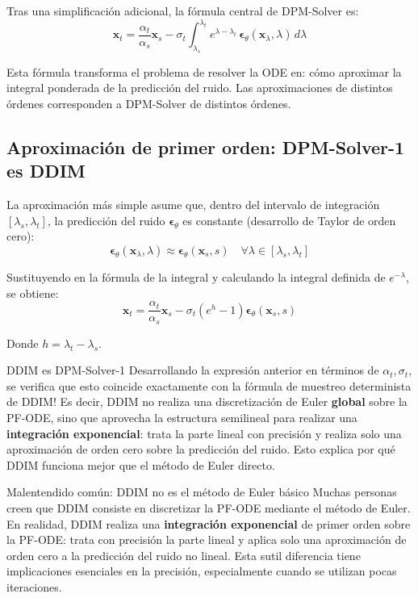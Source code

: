 \documentclass[a4paper]{article}
\begin{document}
Tras una simplificación adicional, la fórmula central de DPM-Solver es:
$$\mathbf{x}_t = \frac{\alpha_t}{\alpha_s} \mathbf{x}_s - \sigma_t \int_{\lambda_s}^{\lambda_t} e^{\lambda - \lambda_t}\, \boldsymbol{\epsilon}_\theta(\mathbf{x}_\lambda, \lambda)\, d\lambda$$

Esta fórmula transforma el problema de resolver la ODE en: cómo aproximar la integral ponderada de la predicción del ruido. Las aproximaciones de distintos órdenes corresponden a DPM-Solver de distintos órdenes.

\subsection{Aproximación de primer orden: DPM-Solver-1 es DDIM}

La aproximación más simple asume que, dentro del intervalo de integración $[\lambda_s, \lambda_t]$, la predicción del ruido $\boldsymbol{\epsilon}_\theta$ es constante (desarrollo de Taylor de orden cero):
$$\boldsymbol{\epsilon}_\theta(\mathbf{x}_\lambda, \lambda) \approx \boldsymbol{\epsilon}_\theta(\mathbf{x}_s, s) \quad \forall \lambda \in [\lambda_s, \lambda_t]$$

Sustituyendo en la fórmula de la integral y calculando la integral definida de $e^{-\lambda}$, se obtiene:
$$\mathbf{x}_t = \frac{\alpha_t}{\alpha_s} \mathbf{x}_s - \sigma_t (e^{h} - 1) \boldsymbol{\epsilon}_\theta(\mathbf{x}_s, s)$$

Donde $h = \lambda_t - \lambda_s$.

\begin{importantbox}{DDIM es DPM-Solver-1}
Desarrollando la expresión anterior en términos de $\alpha_t, \sigma_t$, se verifica que esto coincide exactamente con la fórmula de muestreo determinista de DDIM! Es decir, DDIM no realiza una discretización de Euler \textbf{global} sobre la PF-ODE, sino que aprovecha la estructura semilineal para realizar una \textbf{integración exponencial}: trata la parte lineal con precisión y realiza solo una aproximación de orden cero sobre la predicción del ruido. Esto explica por qué DDIM funciona mejor que el método de Euler directo.
\end{importantbox}

\begin{warningbox}{Malentendido común: DDIM no es el método de Euler básico}
Muchas personas creen que DDIM consiste en discretizar la PF-ODE mediante el método de Euler. En realidad, DDIM realiza una \textbf{integración exponencial} de primer orden sobre la PF-ODE: trata con precisión la parte lineal y aplica solo una aproximación de orden cero a la predicción del ruido no lineal. Esta sutil diferencia tiene implicaciones esenciales en la precisión, especialmente cuando se utilizan pocas iteraciones.
\end{warningbox}
\end{document}
